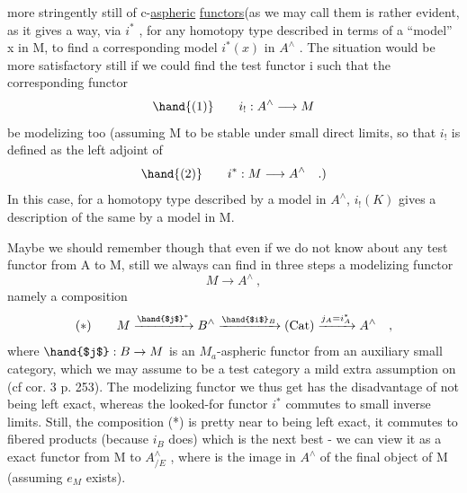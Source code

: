 
more stringently still of c-\uline{aspheric} \uline{functors}(as we may call them is
rather evident,  as it gives a way,  via $i^{*}$ ,  for any homotopy type
described in terms of a ``model'' x in M,  to find a corresponding model
$i^{*}(x)$ in $A^{\wedge}$ .  The situation would be more satisfactory still if we 
could find the test functor i such that the corresponding functor
\[ \hand{(1)} \qquad i_{!} : A^{\wedge} \longrightarrow M \]
be modelizing too  (assuming M to be stable under small direct limits,
so that $i_{!}$ is defined as the left adjoint of 
\[ \hand{(2)} \qquad i^{*} : M \longrightarrow A^{\wedge} \quad .) \]
In this case,  for a homotopy type described by a model  in $A^{\wedge}$,
$i_{!}(K)$  gives a description of the same by a model in M.

Maybe we should remember though that even if we do not know about
any test functor from A to M,  still we always can find in three steps
a modelizing functor
\[ M \longrightarrow A^{\wedge} \ , \]
namely a composition
\[ (*) \qquad M \xrightarrow{\hand{$j$}^{*}} B^{\wedge} \xrightarrow{\hand{$i$}_{B}} (\mathrm{Cat}) \xrightarrow{j_{A} = i_{A}^{*}} A^{\wedge} \quad , \]
where  $\hand{$j$}: B \to M$  is an $M_{a}$-aspheric functor from an auxiliary small
category,  which  we may assume to be a  test category\hand{,} 
 a mild extra assumption on  (cf cor. 3  p. 253).  The modelizing
functor we thus get has  the disadvantage of not being left exact,
whereas the looked-for functor $i^{*}$ commutes to small inverse limits.
Still,  the composition (*)  is pretty near to being left exact,  it
commutes to fibered products (because $i_{B}$  does)  which is the next best
-  we can view it as a  exact functor from  M  to  $A^{\wedge}_{/E}$ ,  where  is
the image in $A^{\wedge}$ of the final object of M (assuming  $e_{M}$ exists).

